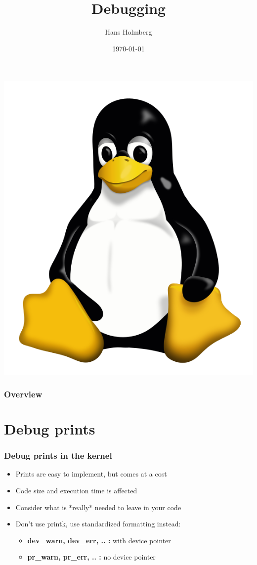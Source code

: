 \documentclass{beamer}
\title[TLKDCC Debugging]{Debugging}
\author{Hans Holmberg}
\institute[LKTP]
{
Linux Kernel Teaching Project \\ 
\medskip
\textit{hans.holmberg@gmail.com}
}
\date{\today}
\begin{document}
\begin{frame}
\titlepage
\includegraphics{../common/tux} 
\end{frame}

\begin{frame}
\frametitle{Overview}
\tableofcontents 
\end{frame}

\section{Debug prints}

\begin{frame}
\frametitle{Debug prints in the kernel}
\begin{itemize}
	\item Prints are easy to implement, but comes at a cost
	\item Code size and execution time is affected
	\item Consider what is *really* needed to leave in your code
	\item Don't use printk, use standardized formatting instead:
	\begin{itemize}
		\item \textbf{dev\_warn, dev\_err, .. :} with device pointer
		\item \textbf{pr\_warn, pr\_err, .. :} no device pointer
	\end{itemize}
\end{itemize}
\end{frame}
\end{document}
